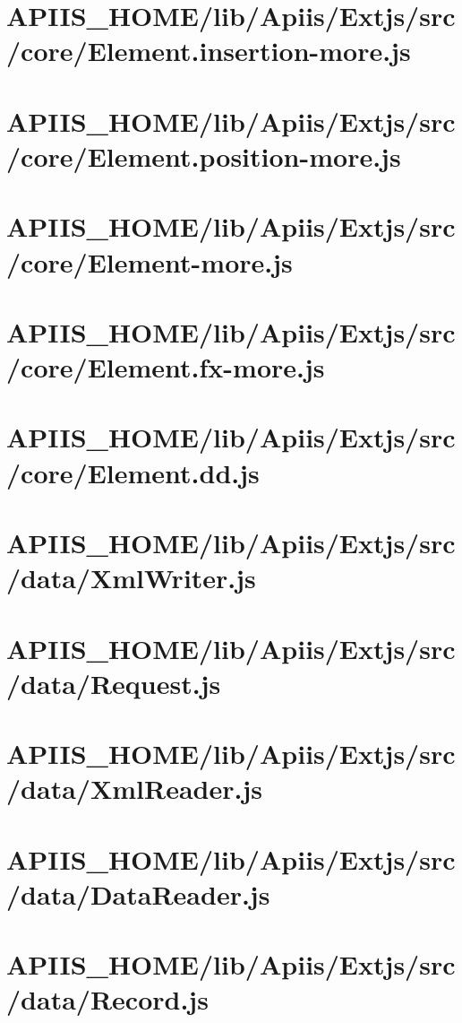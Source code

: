 \section{APIIS\_HOME/lib/Apiis/Extjs/src/core/Element.insertion-more.js} 
\section{APIIS\_HOME/lib/Apiis/Extjs/src/core/Element.position-more.js} 
\section{APIIS\_HOME/lib/Apiis/Extjs/src/core/Element-more.js} 
\section{APIIS\_HOME/lib/Apiis/Extjs/src/core/Element.fx-more.js} 
\section{APIIS\_HOME/lib/Apiis/Extjs/src/core/Element.dd.js} 
\section{APIIS\_HOME/lib/Apiis/Extjs/src/data/XmlWriter.js} 
\section{APIIS\_HOME/lib/Apiis/Extjs/src/data/Request.js} 
\section{APIIS\_HOME/lib/Apiis/Extjs/src/data/XmlReader.js} 
\section{APIIS\_HOME/lib/Apiis/Extjs/src/data/DataReader.js} 
\section{APIIS\_HOME/lib/Apiis/Extjs/src/data/Record.js} 
